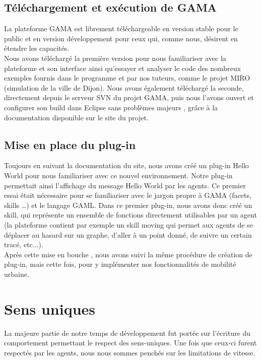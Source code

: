 \documentclass[11pt]{report} %
\begin{document}
\section{T\'el\'echargement et ex\'ecution de GAMA}
La plateforme GAMA est librement t\'el\'echargeable en version stable pour le public et en version d\'eveloppement pour ceux qui, comme nous, d\'esirent en \'etendre les capacit\'es.\\
Nous avons t\'el\'echarg\'e la premi\`ere version pour nous familiariser avec la plateforme et son interface ainsi qu'essayer et analyser le code des nombreux exemples fournis dans le programme et par nos tuteurs, comme le projet MIRO (simulation de la ville de Dijon). Nous avons \'egalement t\'el\'echarg\'e la seconde, directement depuis le serveur SVN du projet GAMA, puis nous l'avons ouvert et configurer son build dans Eclipse sans probl\`emes majeurs , grâce \`a la documentation disponible sur le site du projet.

\section{Mise en place du plug-in}
Toujours en suivant la documentation du site, nous avons cr\'e\'e un plug-in \og Hello World \fg{} pour nous familiariser avec ce nouvel environnement. Notre plug-in permettait ainsi l'affichage du message \og Hello World \fg{} par les agents. Ce premier essai \'etait n\'ecessaire pour se familiariser avec le jargon propre \`a GAMA (facets, skills …) et le langage GAML. Dans ce premier plug-in, nous avons donc cr\'e\'e un skill, qui repr\'esente un ensemble de fonctions directement utilisables par un agent (la plateforme contient par exemple un skill \og moving \fg{} qui permet aux agents de se d\'eplacer au hasard sur un graphe, d'aller \`a un point donn\'e, de suivre un certain trac\'e, etc...).\\
Apr\`es cette \og mise en bouche \fg{}, nous avons suivi la m\^eme proc\'edure de cr\'eation de plug-in, mais cette fois, pour y impl\'ementer nos fonctionnalit\'es de mobilit\'e urbaine.

\chapter{Sens uniques}
La majeure partie de notre temps de d\'eveloppement fut port\'ee sur l'\'ecriture du comportement permettant le respect des sens-uniques. Une fois que ceux-ci furent respect\'es par les agents, nous nous sommes pench\'es sur les limitations de vitesse.
\end{document}
